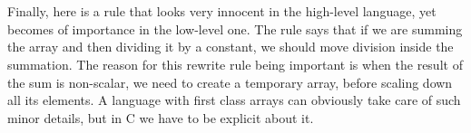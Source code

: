 \begin{code}%
\>[0]\AgdaSpace{}%
\AgdaSymbol{(}\AgdaSpace{}%
\AgdaSpace{}%
\AgdaSymbol{)}\AgdaSpace{}%
\AgdaSpace{}%
\AgdaSpace{}%
\<%
\\
\>[0]\AgdaSpace{}%
\AgdaSymbol{|}\AgdaSpace{}%
\AgdaSpace{}%
\AgdaSpace{}%
\AgdaSymbol{=}\AgdaSpace{}%
\AgdaSpace{}%
\AgdaSymbol{(}\AgdaSpace{}%
\AgdaSpace{}%
\AgdaSymbol{)}\<%
\\
\>[0]\<%
\end{code}
Finally, here is a rule that looks very innocent in the high-level language, yet
becomes of importance in the low-level one.  The rule says that if we are summing
the array and then dividing it by a constant, we should move division inside the
summation.  The reason for this rewrite rule being important is when the result
of the sum is non-scalar, we need to create a temporary array, before scaling down
all its elements.  A language with first class arrays can obviously take care of
such minor details, but in C we have to be explicit about it.
\begin{code}[hide]%
\>[0]\AgdaSpace{}%
\AgdaCatchallClause{\AgdaSymbol{|}}\AgdaSpace{}%
\AgdaSpace{}%
\AgdaSymbol{=}\AgdaSpace{}%
\AgdaSpace{}%
\AgdaSpace{}%
\<%
\\
\>[0]\AgdaSpace{}%
\AgdaSpace{}%
\AgdaSymbol{=}\AgdaSpace{}%
\<%
\end{code}

